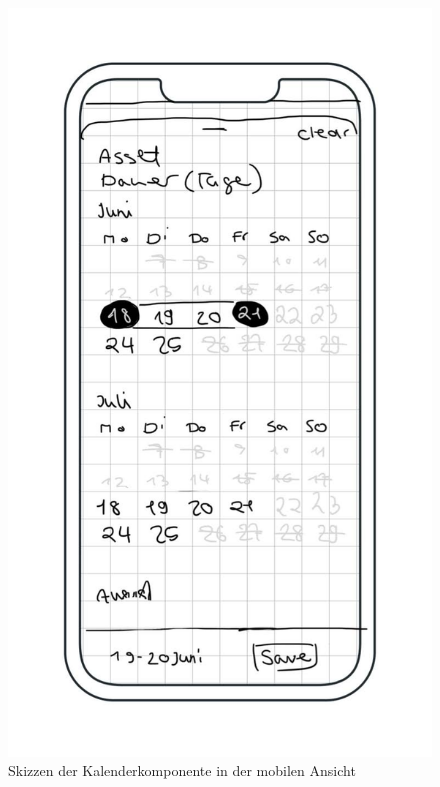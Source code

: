 \begin{figure}[h]
    \centering
    \includegraphics[scale=0.35]{Bilder/Mockups/Kalender.jpg}\hspace{2em}
    \caption{Skizzen der Kalenderkomponente in der mobilen Ansicht}
    \label{fig:kalender}
\end{figure}

